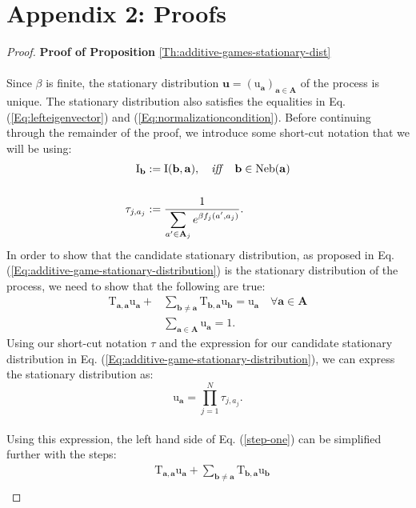 \documentclass[11pt]{article}
\theoremstyle{plainCl1}
\theoremstyle{plainCl2}
\newcommand{\A}{\mathbf{A}}
\newcommand{\abf}{\mathbf{a}}
\newcommand{\bbf}{\mathbf{b}}
\newcommand{\ubf}{\mathbf{u}}
\begin{document}
\section*{Appendix 2: Proofs}
\label{Section:Appendix}
\begin{proof}
\textbf{Proof of Proposition} \ref{Th:additive-games-stationary-dist} \\ \\ 
Since $\beta$ is finite, the stationary distribution $\ubf = (\mathrm{u}_\abf)_{\abf \in \A}$ of the process is unique. The stationary distribution also satisfies the equalities in Eq. (\ref{Eq:lefteigenvector}) and (\ref{Eq:normalizationcondition}). Before continuing through the remainder of the proof, we introduce some short-cut notation that we will be using:\\
\begin{align}
\mathrm{I}_{\bbf} &:= \mathrm{I}(\bbf,\abf), \quad \mathit{iff} \quad \bbf \in \mathrm{Neb}(\abf) \\ \notag \\ 
\label{Eq:shortcut-tau}
\tau_{j,a_j} &:= \frac{1}{\displaystyle \sum_{a' \in \A_j} e^{\beta f_j(a',  a_j)}} .
\end{align}
\noindent In order to show that the candidate stationary distribution, as proposed in Eq. (\ref{Eq:additive-game-stationary-distribution}) is the stationary distribution of the process, we need to show that the following are true:
\begin{align}
\label{step-one}
\mathrm{T}_{\abf,\abf} \mathrm{u}_\abf  + &\sum_{\bbf \neq \abf} \mathrm{T}_{\bbf, \abf} \mathrm{u}_{\bbf} = \mathrm{u}_\abf \quad \forall \abf \in \A \\[10pt]
\label{step-two}
&\sum_{\abf \in \A} \mathrm{u}_\abf  = 1 .
\end{align} 
Using our short-cut notation $\tau$ and the expression for our candidate stationary distribution in Eq. (\ref{Eq:additive-game-stationary-distribution}), we can express the stationary distribution as: 
\begin{equation}
\mathrm{u}_\abf = \prod_{j=1}^N \tau_{j,a_j} .
\label{Eq:additive-stat-shortcut}
\end{equation} \\ 
Using this expression, the left hand side of Eq. (\ref{step-one}) can be simplified further with the steps: 
\begin{align}
&\mathrm{T}_{\abf,\abf} \mathrm{u}_\abf  + \sum_{\bbf \neq \abf} \mathrm{T}_{\bbf, \abf} \mathrm{u}_{\bbf}\\

\end{align}
\end{proof}
\end{document}
